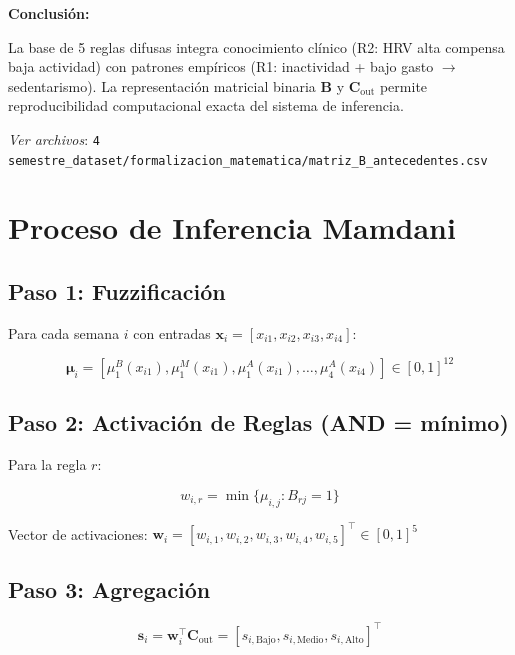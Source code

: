 \documentclass[12pt,letterpaper,twoside]{report}
\newcommand{\vect}[1]{\boldsymbol{#1}}
\newcommand{\mat}[1]{\mathbf{#1}}
\begin{document}
\begin{conclusionbox}
\textbf{Conclusión:}

La base de 5 reglas difusas integra conocimiento clínico (R2: HRV alta compensa baja actividad) con patrones empíricos (R1: inactividad + bajo gasto $\to$ sedentarismo). La representación matricial binaria $\mat{B}$ y $\mat{C}_{\text{out}}$ permite reproducibilidad computacional exacta del sistema de inferencia.
\end{conclusionbox}

\textit{Ver archivos}: \texttt{4 semestre\_dataset/formalizacion\_matematica/matriz\_B\_antecedentes.csv}

\section{Proceso de Inferencia Mamdani}

\subsection{Paso 1: Fuzzificación}

Para cada semana $i$ con entradas $\vect{x}_i = [x_{i1}, x_{i2}, x_{i3}, x_{i4}]$:

\begin{equation}
\vect{\mu}_i = [\mu_1^B(x_{i1}), \mu_1^M(x_{i1}), \mu_1^A(x_{i1}), \ldots, \mu_4^A(x_{i4})] \in [0,1]^{12}
\end{equation}

\subsection{Paso 2: Activación de Reglas (AND = mínimo)}

Para la regla $r$:

\begin{equation}
w_{i,r} = \min\{\mu_{i,j} : B_{rj} = 1\}
\end{equation}

Vector de activaciones: $\vect{w}_i = [w_{i,1}, w_{i,2}, w_{i,3}, w_{i,4}, w_{i,5}]^\top \in [0,1]^5$

\subsection{Paso 3: Agregación}

\begin{equation}
\vect{s}_i = \vect{w}_i^\top \mat{C}_{\text{out}} = [s_{i,\text{Bajo}}, s_{i,\text{Medio}}, s_{i,\text{Alto}}]^\top
\end{equation}
\end{document}
